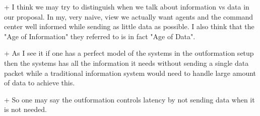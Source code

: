 \documentclass[12pt,letterpaper]{article}
\begin{document}
+ I think we may try to distinguish when we talk about information vs data in our proposal. In my, very naive, view we actually want agents and the command center well informed while sending as little data as possible. I also think that the "Age of Information" they referred to is in fact "Age of Data".
\\ \quad

+ As I see it if one has a perfect model of the systems in the outformation setup then the systems has all the information it needs without sending a single data packet while a traditional information system would need to handle large amount of data to achieve this.
\\ \quad

+ So one may say the outformation controls latency by not sending data when it is not needed. 
\\ \quad


%
%
\end{document}
